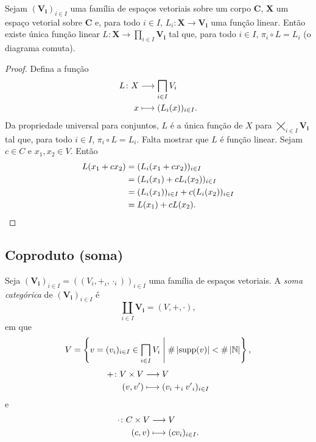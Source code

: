 \begin{proposition}
Sejam $(\bm{V_i})_{i \in I}$ uma família de espaços vetoriais sobre um corpo $\bm C$, $\bm X$ um espaço vetorial sobre $\bm C$ e, para todo $i \in I$, $L_i: \bm X \to \bm{V_i}$ uma função linear. Então existe única função linear $L: \bm X \to \prod_{i \in I} \bm{V_i}$ tal que, para todo $i \in I$, $\pi_i \circ L = L_i$ (o diagrama comuta).
\begin{figure}
\centering
{}
\end{figure}
\end{proposition}
\begin{proof}
Defina a função
	\begin{align*}
	\func{L}{X}{\prod_{i \in I} V_i}{x}{(L_i(x))_{i \in I}}.
	\end{align*}
Da propriedade universal para conjuntos, $L$ é a única função de $X$ para $\bigtimes_{i \in I} \bm{V_i}$ tal que, para todo $i \in I$, $\pi_i \circ L = L_i$. Falta mostrar que $L$ é função linear. Sejam $c \in C$ e $x_1,x_2 \in V$. Então
	\begin{align*}
	L(x_1+cx_2) &= (L_i(x_1+cx_2))_{i \in I} \\
		&= (L_i(x_1)+cL_i(x_2))_{i \in I} \\
		&= (L_i(x_1))_{i \in I}+c(L_i(x_2))_{i \in I} \\
		&= L(x_1)+cL(x_2). \qedhere
	\end{align*}
\end{proof}

\subsection{Coproduto (soma)}

\begin{definition}
Seja $(\bm{V_i})_{i \in I} = ((V_i,+_i,\cdot_i))_{i \in I}$ uma família de espaços vetoriais. A \emph{soma categórica} de $(\bm{V_i})_{i \in I}$ é
	\begin{equation*}
	\coprod_{i \in I} \bm{V_i} = (V,+,\cdot),
	\end{equation*}
em que
	\begin{equation*}
	V = \set{v=(v_i)_{i \in I} \in \prod_{i \in I} V_i}{\card{\supp(v)} < \card{\N}},
	\end{equation*}
	\begin{align*}
	{+}\colon {V \times V} &\longrightarrow {V} \\{(v,v')} &\longmapsto (v_i +_i {v'}_i)_{i \in I}
	\end{align*}
e
	\begin{align*}
	{\cdot}\colon {C \times V} &\longrightarrow {V} \\{(c,v)} &\longmapsto (cv_i)_{i \in I}.
	\end{align*}
\end{definition}

